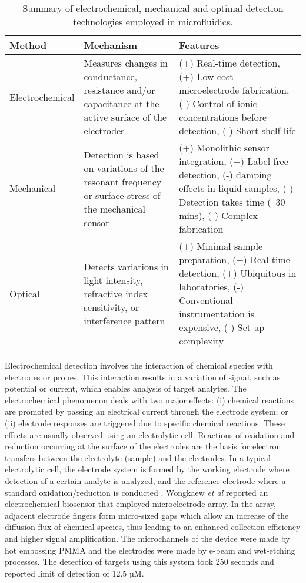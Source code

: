 \newpage

\begin{table}
\begin{center}
    \label{tab:detectors}
    \begin{tabular}{|p{5cm}||p{5cm}||p{5cm}|}\hline\hline
      Method & Mechanism & Features \\ \hline
      Electrochemical & Measures changes in conductance, resistance and/or capacitance at the active surface of the electrodes  &
      (+) Real-time detection, (+) Low-cost microelectrode fabrication, (-) Control of ionic concentrations before detection, (-) Short shelf life  \\ \hline
      Mechanical & Detection is based on variations of the resonant frequency or surface stress of the mechanical sensor &
      (+) Monolithic sensor integration, (+) Label free detection, (-) damping effects in liquid samples, (-) Detection takes time (~30 mins), (-) Complex fabrication  \\ \hline
      Optical & Detects variations in light intensity, refractive index sensitivity, or interference pattern &
      (+) Minimal sample preparation, (+) Real-time detection, (+) Ubiquitous in laboratories, (-) Conventional instrumentation is expensive, (-) Set-up complexity \\ \hline\hline
    \end{tabular}
\caption{Summary of electrochemical, mechanical and optimal detection technologies employed in microfluidics.}
\end{center}
\end{table}

Electrochemical detection involves the interaction of chemical species with electrodes or probes. This interaction
results in a variation of signal, such as potential or current, which enables analysis of target analytes. The
electrochemical phenomenon deals with two major effects: (i) chemical reactions are promoted by passing an
electrical current through the electrode system; or (ii) electrode responses are triggered due to specific chemical reactions. These
effects are usually observed using an electrolytic cell. Reactions of oxidation and reduction occurring at the surface of the electrodes
are the basis for electron transfers between the electrolyte (sample) and the electrodes. In a typical
electrolytic cell, the electrode system is formed by the working electrode where detection of a certain
analyte is analyzed, and the reference electrode where a standard oxidation/reduction is conducted \citep{flanagan2005electrochemical}.
Wongkaew \textit{et al} reported an electrochemical biosensor that employed microelectrode array. In
the array, adjacent electrode fingers form micro-sized gaps which allow an increase of the diffusion flux
of chemical species, thus leading to an enhanced collection efficiency and higher signal amplification.
The microchannels of the device were made by hot embossing PMMA and the electrodes were made by e-beam
and wet-etching processes. The detection of targets using this system took 250 seconds and reported
limit of detection of 12.5 µM.

